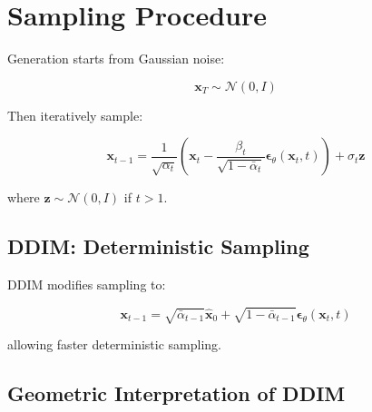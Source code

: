 \section{Sampling Procedure}

Generation starts from Gaussian noise:

\begin{equation}
\mathbf{x}_T \sim \mathcal{N}(0, I)
\end{equation}

Then iteratively sample:

\begin{equation}
\mathbf{x}_{t-1}
=
\frac{1}{\sqrt{\alpha_t}}
\left(
\mathbf{x}_t
-
\frac{\beta_t}{\sqrt{1 - \bar{\alpha}_t}}
\boldsymbol{\epsilon}_\theta(\mathbf{x}_t, t)
\right)
+
\sigma_t \mathbf{z}
\end{equation}

where $\mathbf{z} \sim \mathcal{N}(0,I)$ if $t > 1$.





\subsection{DDIM: Deterministic Sampling}

DDIM modifies sampling to:

\begin{equation}
\mathbf{x}_{t-1}
=
\sqrt{\bar{\alpha}_{t-1}}
\hat{\mathbf{x}}_0
+
\sqrt{1 - \bar{\alpha}_{t-1}}
\boldsymbol{\epsilon}_\theta(\mathbf{x}_t, t)
\end{equation}

allowing faster deterministic sampling.

\subsection{Geometric Interpretation of DDIM}


